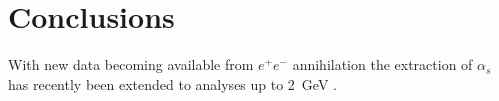 \documentclass[../../index.tex]{subfiles}
\begin{document}
\chapter{Conclusions}
With new data becoming available from \(e^+e^-\) annihilation the extraction of \(\alpha_s\)
has recently been extended to analyses up to \SI{2}{\giga\eV} \cite{Boito2018}.
\end{document}
